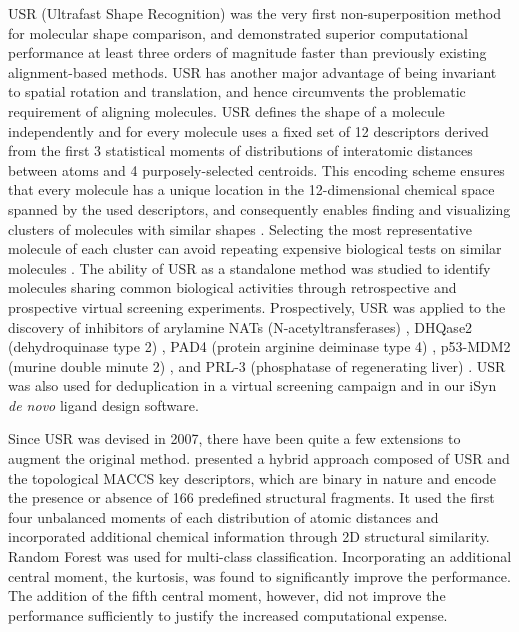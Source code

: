 USR (Ultrafast Shape Recognition) \citep{1379} was the very first non-superposition method for molecular shape comparison, and demonstrated superior computational performance at least three orders of magnitude faster than previously existing alignment-based methods. USR has another major advantage of being invariant to spatial rotation and translation, and hence circumvents the problematic requirement of aligning molecules. USR defines the shape of a molecule independently and for every molecule uses a fixed set of 12 descriptors derived from the first 3 statistical moments of distributions of interatomic distances between atoms and 4 purposely-selected centroids. This encoding scheme ensures that every molecule has a unique location in the 12-dimensional chemical space spanned by the used descriptors, and consequently enables finding and visualizing clusters of molecules with similar shapes \citep{1280,1332}. Selecting the most representative molecule of each cluster can avoid repeating expensive biological tests on similar molecules \citep{1280}. The ability of USR as a standalone method was studied to identify molecules sharing common biological activities through retrospective \citep{1332} and prospective \citep{1380,1281,1504,1502,1615} virtual screening experiments. Prospectively, USR was applied to the discovery of inhibitors of arylamine NATs (N-acetyltransferases) \citep{1380}, DHQase2 (dehydroquinase type 2) \citep{1281}, PAD4 (protein arginine deiminase type 4) \citep{1504}, p53-MDM2 (murine double minute 2) \citep{1502}, and PRL-3 (phosphatase of regenerating liver) \citep{1615}. USR was also used for deduplication in a virtual screening campaign \citep{1390} and in our iSyn \citep{1409,1387} \textit{de novo} ligand design software.

Since USR was devised in 2007, there have been quite a few extensions \citep{1333,1436,1437,1334,1335,1337,1338,1331,1407,1408} to augment the original method. \citep{1333} presented a hybrid approach composed of USR and the topological MACCS key descriptors, which are binary in nature and encode the presence or absence of 166 predefined structural fragments. It used the first four unbalanced moments of each distribution of atomic distances and incorporated additional chemical information through 2D structural similarity. Random Forest \citep{1309} was used for multi-class classification. Incorporating an additional central moment, the kurtosis, was found to significantly improve the performance. The addition of the fifth central moment, however, did not improve the performance sufficiently to justify the increased computational expense.

